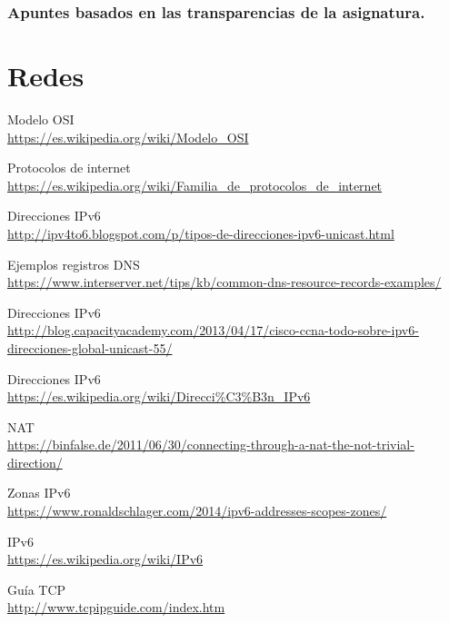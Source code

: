 \begin{thebibliography}{9}
\subsubsection*{Apuntes basados en las transparencias de la asignatura.}
\section*{Redes}
\bibitem{} 
Modelo OSI
\\\url{https://es.wikipedia.org/wiki/Modelo\_OSI}

\bibitem{} 
Protocolos de internet
\\\url{https://es.wikipedia.org/wiki/Familia\_de\_protocolos\_de\_internet}

\bibitem{} 
Direcciones IPv6
\\\url{http://ipv4to6.blogspot.com/p/tipos-de-direcciones-ipv6-unicast.html}

\bibitem{} 
Ejemplos registros DNS
\\\url{https://www.interserver.net/tips/kb/common-dns-resource-records-examples/}

\bibitem{}
Direcciones IPv6
\\\url{http://blog.capacityacademy.com/2013/04/17/cisco-ccna-todo-sobre-ipv6-direcciones-global-unicast-55/}

\bibitem{} 
Direcciones IPv6
\\\url{https://es.wikipedia.org/wiki/Direcci\%C3\%B3n\_IPv6}

\bibitem{} 
NAT
\\\url{https://binfalse.de/2011/06/30/connecting-through-a-nat-the-not-trivial-direction/}

\bibitem{} 
Zonas IPv6
\\\url{https://www.ronaldschlager.com/2014/ipv6-addresses-scopes-zones/}

\bibitem{} 
IPv6
\\\url{https://es.wikipedia.org/wiki/IPv6}

\bibitem{} 
Guía TCP
\\\url{http://www.tcpipguide.com/index.htm}


\end{thebibliography}
